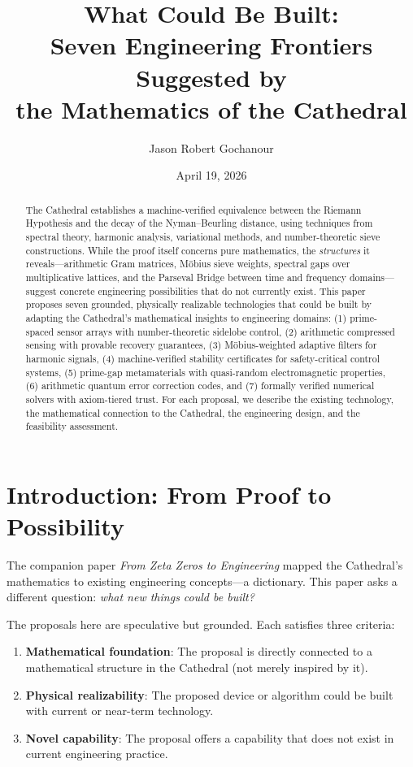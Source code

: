 \documentclass[11pt,a4paper]{article}
\title{%
  What Could Be Built:\\
  Seven Engineering Frontiers Suggested by\\
  the Mathematics of the Cathedral%
}
\author{
  Jason Robert Gochanour
}
\date{April 19, 2026}
\begin{document}
\maketitle

\begin{abstract}
The Cathedral establishes a machine-verified equivalence between
the Riemann Hypothesis and the decay of the Nyman--Beurling
distance, using techniques from spectral theory, harmonic analysis,
variational methods, and number-theoretic sieve constructions.
While the proof itself concerns pure mathematics, the
\emph{structures} it reveals---arithmetic Gram matrices, M\"obius
sieve weights, spectral gaps over multiplicative lattices, and the
Parseval Bridge between time and frequency domains---suggest
concrete engineering possibilities that do not currently exist.
This paper proposes seven grounded, physically realizable
technologies that could be built by adapting the Cathedral's
mathematical insights to engineering domains: (1) prime-spaced
sensor arrays with number-theoretic sidelobe control, (2) arithmetic
compressed sensing with provable recovery guarantees,
(3) M\"obius-weighted adaptive filters for harmonic signals,
(4) machine-verified stability certificates for safety-critical
control systems, (5) prime-gap metamaterials with quasi-random
electromagnetic properties, (6) arithmetic quantum error correction
codes, and (7) formally verified numerical solvers with axiom-tiered
trust. For each proposal, we describe the existing technology, the
mathematical connection to the Cathedral, the engineering design,
and the feasibility assessment.
\end{abstract}

\tableofcontents

\section{Introduction: From Proof to Possibility}

The companion paper \emph{From Zeta Zeros to Engineering} mapped
the Cathedral's mathematics to existing engineering concepts---a
dictionary. This paper asks a different question: \emph{what new
things could be built?}

The proposals here are speculative but grounded. Each satisfies
three criteria:

\begin{enumerate}
  \item \textbf{Mathematical foundation}: The proposal is directly
    connected to a mathematical structure in the Cathedral (not
    merely inspired by it).
  \item \textbf{Physical realizability}: The proposed device or
    algorithm could be built with current or near-term technology.
  \item \textbf{Novel capability}: The proposal offers a capability
    that does not exist in current engineering practice.
\end{enumerate}
\end{document}
